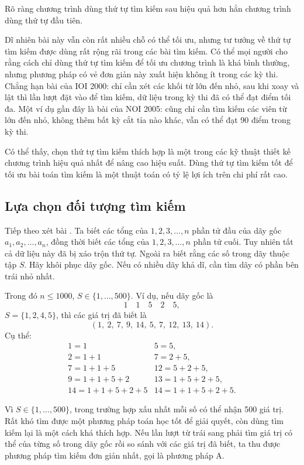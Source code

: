 \documentclass[11pt]{article}
\begin{document}
Rõ ràng chương trình dùng thứ tự tìm kiếm sau hiệu quả hơn hẳn chương trình
dùng thứ tự đầu tiên.

Dĩ nhiên bài này vẫn còn rất nhiều chỗ có thể tối ưu, nhưng tư tưởng về thứ
tự tìm kiếm được dùng rất rộng rãi trong các bài tìm kiếm. Có thể mọi người
cho rằng cách chỉ dùng thứ tự tìm kiếm để tối ưu chương trình là khá bình
thường, nhưng phương pháp có vẻ đơn giản này xuất hiện không ít trong các kỳ
thi. Chẳng hạn bài  của IOI 2000: chỉ cần xét các khối từ lớn đến
nhỏ, sau khi xoay và lật thì lần lượt đặt vào để tìm kiếm, dữ liệu trong kỳ
thi đã có thể đạt điểm tối đa. Một ví dụ gần đây là bài 
của NOI 2005: cũng chỉ cần tìm kiếm các viên từ lớn đến nhỏ, không thêm bất kỳ
cắt tỉa nào khác, vẫn có thể đạt 90 điểm trong kỳ thi.

Có thể thấy, chọn thứ tự tìm kiếm thích hợp là một trong các kỹ thuật thiết
kế chương trình hiệu quả nhất để nâng cao hiệu suất. Dùng thứ tự tìm kiếm tốt
để tối ưu bài toán tìm kiếm là một thuật toán có tỷ lệ lợi ích trên chi phí
rất cao.

\subsection{Lựa chọn đối tượng tìm kiếm}

Tiếp theo xét bài . Ta biết các tổng của \(1,2,3,\ldots,n\)
phần tử đầu của dãy gốc \(a_1,a_2,\ldots,a_n\), đồng thời biết các tổng của
\(1,2,3,\ldots,n\) phần tử cuối. Tuy nhiên tất cả dữ liệu này đã bị xáo trộn
thứ tự. Ngoài ra biết rằng các số trong dãy thuộc tập \(S\). Hãy khôi phục dãy
gốc. Nếu có nhiều dãy khả dĩ, cần tìm dãy có phần bên trái nhỏ nhất.

Trong đó \(n\le 1000\), \(S\in \{1,\ldots,500\}\). Ví dụ, nếu dãy gốc là
\[
  1\quad 1\quad 5\quad 2\quad 5,
\]
\(S=\{1,2,4,5\}\), thì các giá trị đã biết là
\[
  (1,\ 2,\ 7,\ 9,\ 14,\ 5,\ 7,\ 12,\ 13,\ 14).
\]
Cụ thể:
\[
\begin{array}{ll}
1 = 1                    & 5 = 5,\\
2 = 1+1                  & 7 = 2+5,\\
7 = 1+1+5                & 12 = 5+2+5,\\
9 = 1+1+5+2              & 13 = 1+5+2+5,\\
14 = 1+1+5+2+5           & 14 = 1+1+5+2+5.
\end{array}
\]

Vì \(S\in\{1,\ldots,500\}\), trong trường hợp xấu nhất mỗi số có thể nhận 500
giá trị. Rất khó tìm được một phương pháp toán học tốt để giải quyết, còn dùng
tìm kiếm lại là một cách khá thích hợp. Nếu lần lượt từ trái sang phải tìm giá
trị có thể của từng số trong dãy gốc rồi so sánh với các giá trị đã biết, ta
thu được phương pháp tìm kiếm đơn giản nhất, gọi là phương pháp A.
\end{document}
